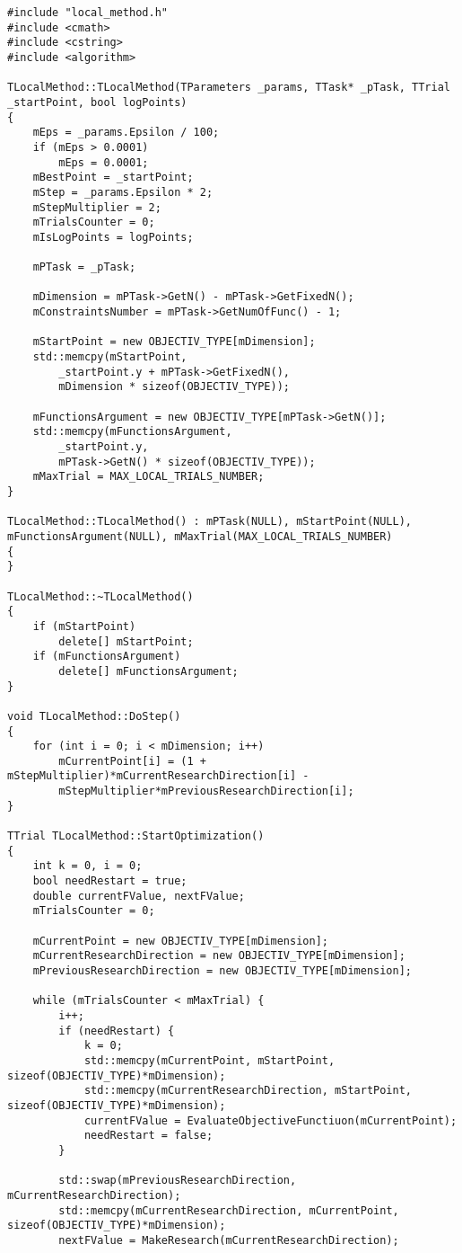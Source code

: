 \begin{lstlisting}[frame=single]
#include "local_method.h"
#include <cmath>
#include <cstring>
#include <algorithm>

TLocalMethod::TLocalMethod(TParameters _params, TTask* _pTask, TTrial _startPoint, bool logPoints)
{
	mEps = _params.Epsilon / 100;
	if (mEps > 0.0001)
		mEps = 0.0001;
	mBestPoint = _startPoint;
	mStep = _params.Epsilon * 2;
	mStepMultiplier = 2;
	mTrialsCounter = 0;
	mIsLogPoints = logPoints;

	mPTask = _pTask;

	mDimension = mPTask->GetN() - mPTask->GetFixedN();
	mConstraintsNumber = mPTask->GetNumOfFunc() - 1;

	mStartPoint = new OBJECTIV_TYPE[mDimension];
	std::memcpy(mStartPoint,
		_startPoint.y + mPTask->GetFixedN(),
		mDimension * sizeof(OBJECTIV_TYPE));

	mFunctionsArgument = new OBJECTIV_TYPE[mPTask->GetN()];
	std::memcpy(mFunctionsArgument,
		_startPoint.y,
		mPTask->GetN() * sizeof(OBJECTIV_TYPE));
	mMaxTrial = MAX_LOCAL_TRIALS_NUMBER;
}

TLocalMethod::TLocalMethod() : mPTask(NULL), mStartPoint(NULL),
mFunctionsArgument(NULL), mMaxTrial(MAX_LOCAL_TRIALS_NUMBER)
{
}

TLocalMethod::~TLocalMethod()
{
	if (mStartPoint)
		delete[] mStartPoint;
	if (mFunctionsArgument)
		delete[] mFunctionsArgument;
}

void TLocalMethod::DoStep()
{
	for (int i = 0; i < mDimension; i++)
		mCurrentPoint[i] = (1 + mStepMultiplier)*mCurrentResearchDirection[i] -
		mStepMultiplier*mPreviousResearchDirection[i];
}

TTrial TLocalMethod::StartOptimization()
{
	int k = 0, i = 0;
	bool needRestart = true;
	double currentFValue, nextFValue;
	mTrialsCounter = 0;

	mCurrentPoint = new OBJECTIV_TYPE[mDimension];
	mCurrentResearchDirection = new OBJECTIV_TYPE[mDimension];
	mPreviousResearchDirection = new OBJECTIV_TYPE[mDimension];

	while (mTrialsCounter < mMaxTrial) {
		i++;
		if (needRestart) {
			k = 0;
			std::memcpy(mCurrentPoint, mStartPoint, sizeof(OBJECTIV_TYPE)*mDimension);
			std::memcpy(mCurrentResearchDirection, mStartPoint, sizeof(OBJECTIV_TYPE)*mDimension);
			currentFValue = EvaluateObjectiveFunctiuon(mCurrentPoint);
			needRestart = false;
		}

		std::swap(mPreviousResearchDirection, mCurrentResearchDirection);
		std::memcpy(mCurrentResearchDirection, mCurrentPoint, sizeof(OBJECTIV_TYPE)*mDimension);
		nextFValue = MakeResearch(mCurrentResearchDirection);


\end{lstlisting}
